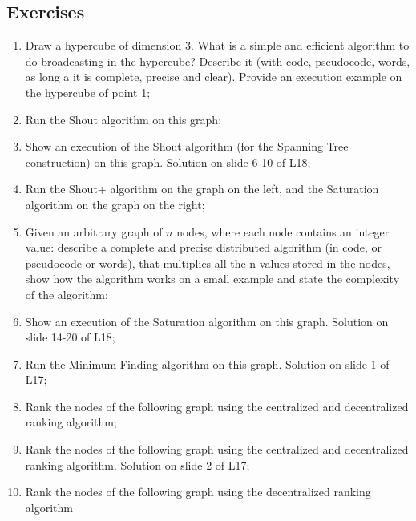 \subsection{Exercises}
\begin{enumerate}
    \item Draw a hypercube of dimension 3. What is a simple and efficient algorithm to do broadcasting in the hypercube? Describe it (with code, pseudocode, words, as long a it is complete, precise and clear). Provide an execution example on the hypercube of point 1;
    \item Run the Shout algorithm on this graph;
    \item Show an execution of the Shout algorithm (for the Spanning Tree construction) on this graph. Solution on slide 6-10 of L18;
    \item Run the Shout+ algorithm on the graph on the left, and the Saturation algorithm on the graph on the right;
    \item Given an arbitrary graph of $n$ nodes, where each node contains an integer value: describe a complete and precise distributed algorithm (in code, or pseudocode or words), that multiplies all the n values stored in the nodes, show how the algorithm works on a small example and state the complexity of the algorithm;
    \item Show an execution of the Saturation algorithm on this graph. Solution on slide 14-20 of L18;
    \item Run the Minimum Finding algorithm on this graph. Solution on slide 1 of L17;
    \item Rank the nodes of the following graph using the centralized and decentralized ranking algorithm;
    \item Rank the nodes of the following graph using the centralized and decentralized ranking algorithm. Solution on slide 2 of L17;
    \item Rank the nodes of the following graph using the decentralized ranking algorithm
\end{enumerate}